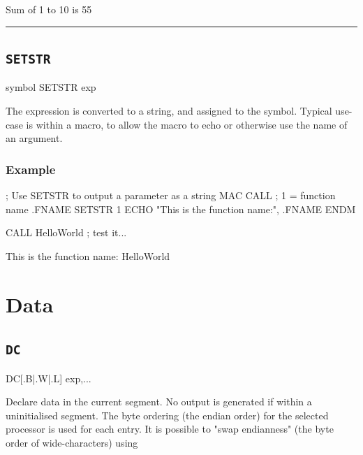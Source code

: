 \begin{outputx}
Sum of 1 to 10 is 55
\end{outputx}


\hrule
\subsection{\texttt{SETSTR}}
\label{pseudoop:setstr}

\begin{usage}
symbol SETSTR exp
\end{usage}

The expression is converted to a string, and assigned to the
symbol. Typical use-case is within a macro, to allow the
macro to echo or otherwise use the name of an argument.

\subsubsection{Example}

\begin{code}[caption=Use of SETSTR to Display Function Name]
; Use SETSTR to output a parameter as a string
    MAC CALL    ; {1} = function name
.FNAME  SETSTR {1}
        ECHO "This is the function name:", .FNAME
    ENDM
    
    CALL HelloWorld        ; test it...
\end{code}

\begin{outputx}
This is the function name: HelloWorld
\end{outputx}



\section{Data}
\subsection{\texttt{DC}}
\label{pseudoop:dc}

\begin{usage}
   DC[{.B|.W|.L}] exp,...
\end{usage}
\label{changelog:20200915endian}
Declare data in the current segment.  No output is generated if within a uninitialised  segment. The byte ordering (the endian order) for the selected processor is used for each entry. It is possible to "swap endianness" (the byte order of wide-characters) using 

